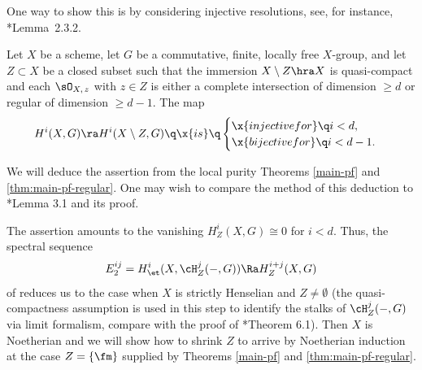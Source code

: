 \bpf
One way to show this is by considering injective resolutions, see, for instance, \cite{BC19}*{Lemma~2.3.2}.
\epf


\bthm \label{P-d-pf}
Let $X$ be a scheme, let $G$ be a commutative, finite, locally free $X$-group, and let $Z \subset X$ be a closed subset such that the immersion $X \setminus Z \hra X$ is quasi-compact and each $\sO_{X,\, z}$ with $z \in Z$ is either a complete intersection of dimension $\ge d$ or regular of dimension $\ge d - 1$. The map
\[
H^i(X, G) \ra H^i(X \setminus Z, G)  \q\x{is} \q  \begin{cases}\x{injective for} \q  i < d, \\ \x{bijective for} \q i < d - 1.\end{cases}
\]
\ethm

\bpf
We will deduce the assertion from the local purity Theorems \ref{main-pf} and \ref{thm:main-pf-regular}. One may wish to compare the method of this deduction to \cite{Gab04a}*{Lemma 3.1 and its proof}.

The assertion amounts to the vanishing $H^i_Z(X, G) \cong 0$ for $i < d$. Thus, the  spectral sequence
\[
E_2^{ij} = H^i_\et(X, \cH^j_Z(-, G)) \Ra H^{i + j}_Z(X, G)
\]
of  reduces us to the case when $X$ is strictly Henselian and $Z \neq \emptyset$ (the quasi-compactness assumption is used in this step to identify the stalks of $\cH^j_Z(-, G)$ via limit formalism, compare with the proof of \cite{brauer-purity}*{Theorem 6.1}). Then $X$ is Noetherian and we will show how to shrink $Z$ to arrive by Noetherian induction at the case $Z = \{\fm\}$ supplied by Theorems \ref{main-pf} and \ref{thm:main-pf-regular}.

